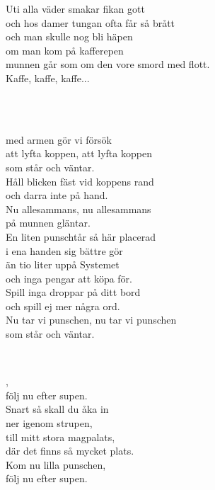 Uti alla väder smakar fikan gott\\  
och hos damer tungan ofta får så brått\\  
och man skulle nog bli häpen\\  
om man kom på kafferepen\\  
munnen går som om den vore smord med flott.\\  
Kaffe, kaffe, kaffe...\\  

\newpage


 \\       

 \\
med armen gör vi försök \\
att lyfta koppen, att lyfta koppen \\
som står och väntar. \\
Håll blicken fäst vid koppens rand \\
och darra inte på hand. \\
Nu allesammans, nu allesammans\\
på munnen gläntar.\\
En liten punschtår så här placerad\\
i ena handen sig bättre gör\\
än tio liter uppå Systemet\\
och inga pengar att köpa för.\\
Spill inga droppar på ditt bord\\
och spill ej mer några ord.\\
Nu tar vi punschen, nu tar vi punschen\\
som står och väntar.\\

\newpage


 \\       

,\\     
följ nu efter supen.\\     
Snart så skall du åka in\\     
ner igenom strupen,\\     
till mitt stora magpalats,\\     
där det finns så mycket plats.\\     
Kom nu lilla punschen,\\     
följ nu efter supen.\\

